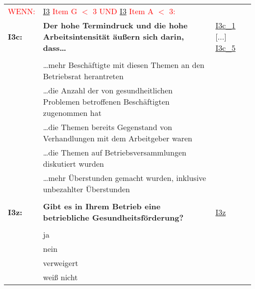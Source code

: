 \begin{longtable}{!{\color{black}\vline width 1pt}  L{2cm}!{\color{black}\vline width 1pt} L{12.25cm}!{\color{black}\vline width 1pt}  L{2.5cm}!{\color{black}\vline width 1pt}}
   &  &  \\ 
   \midrule
{}\textcolor{red}{WENN:} & \textcolor{red}{ \hyperref[I3]{I3} Item G $<$ 3 UND  \hyperref[I3]{I3} Item A $<$ 3:} &  \\ 
  \textbf{I3c:}\label{I3c} & \textbf{Der hohe Termindruck und die hohe Arbeitsintensität äußern sich darin, dass…} & \hyperref[var:I3c:1]{I3c\_1} [...] \hyperref[var:I3c:5]{I3c\_5} \\ 
   &  &  \\ 
   & …mehr Beschäftigte mit diesen Themen an den Betriebsrat herantreten &  \\ 
   & …die Anzahl der von gesundheitlichen Problemen betroffenen Beschäftigten zugenommen hat &  \\ 
   & …die Themen bereits Gegenstand von Verhandlungen mit dem Arbeitgeber waren &  \\ 
   & …die Themen auf Betriebsversammlungen diskutiert wurden &  \\ 
   & …mehr Überstunden gemacht wurden, inklusive unbezahlter Überstunden &  \\ 
   &  &  \\ 
   \midrule
{}\textbf{I3z:}\label{I3z} & \textbf{Gibt es in Ihrem Betrieb eine betriebliche Gesundheitsförderung?} & \hyperref[var:I3z]{I3z} \\ 
   &  &  \\ 
   & ja &  \\ 
   & nein &  \\ 
   & verweigert &  \\ 
   & weiß nicht &  \\ 

\end{longtable}
